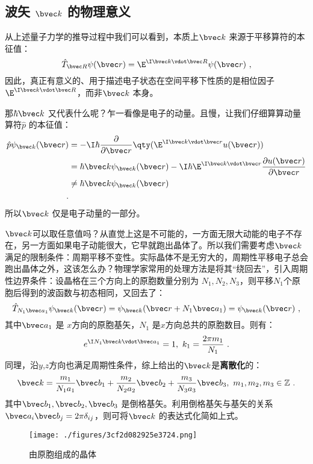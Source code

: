 \subsection{波矢 $\bvec k$ 的物理意义}
从上述量子力学的推导过程中我们可以看到，本质上$\bvec k$ 来源于平移算符的本征值：
\begin{equation}
\hat{T}_{\bvec R} \psi (\bvec r) = \E^{\I \bvec k \vdot  \bvec R}\psi (\bvec r)~,
\end{equation}
因此，真正有意义的、用于描述电子状态在空间平移下性质的是相位因子$\E^{\I \bvec k \vdot  \bvec R}$，而非$\bvec k$ 本身。

那$\hbar \bvec k$ 又代表什么呢？乍一看像是电子的动量。且慢，让我们仔细算算动量算符$\hat{p}$ 的本征值：
\begin{equation}
\begin{aligned}
\hat{p} \psi_{\bvec k} (\bvec r) &= -\I \hbar \dfrac{\partial}{\partial \bvec r} \qty(\E^{\I \bvec k \vdot \bvec r} u(\bvec r))\\
& = \hbar \bvec k \psi_{\bvec k} (\bvec r) -\I \hbar \E^{\I \bvec k \vdot \bvec r} \dfrac{\partial  u(\bvec r)}{\partial \bvec r}\\
 &\neq \hbar \bvec k \psi_{\bvec k} (\bvec r)\\~.
\end{aligned}
\end{equation}
所以$\bvec k$ 仅是电子动量的一部分。

$\bvec k$可以取任意值吗？从直觉上这是不可能的，一方面无限大动能的电子不存在，另一方面如果电子动能很大，它早就跑出晶体了。所以我们需要考虑$\bvec k$ 满足的限制条件：周期平移不变性。实际晶体不是无穷大的，周期性平移电子总会跑出晶体之外，这该怎么办？物理学家常用的处理方法是将其“绕回去”，引入周期性边界条件：设晶格在三个方向上的原胞数量分别为 $N_1,N_2,N_3$，则平移$N_1$个原胞后得到的波函数与初态相同，又回去了：
\begin{equation}
\hat T _{N_1 \bvec a_1}\psi_{\bvec k}(\bvec r)=\psi_{\bvec k}(\bvec r+N_1 \bvec a_1) = \psi_{\bvec k}(\bvec r)~,
\end{equation}
其中$\bvec a_1$ 是 $x$方向的原胞基矢，$N_1$ 是$x$方向总共的原胞数目。则有：
\begin{equation}
e^{\I N_1 \bvec k \vdot  \bvec a_1} = 1,~ k_1 =\frac{2\pi m_1}{N_1}~.
\end{equation}
同理，沿$y$,$z$方向也满足周期性条件，综上给出的$\bvec k$是\textbf{离散化}的：
\begin{equation}
\bvec k = \dfrac{m_1}{N_1 a_1} \bvec b_1 + \dfrac{m_2}{N_2 a_2} \bvec b_2 + \dfrac{m_3}{N_3 a_3} \bvec b_3,~ m_1,m_2,m_3 \in \mathbb{Z}~.
\end{equation}
其中$\bvec b_1, \bvec b_2,\bvec b_3$ 是倒格基矢。利用倒格基矢与基矢的关系$\bvec a_i \bvec b_j = 2\pi \delta_{ij}$，则可将$\bvec k$ 的表达式化简如上式。
\begin{figure}[ht]
\centering
\texttt{[image: ./figures/3cf2d082925e3724.png]}
\caption{由原胞组成的晶体} \label{fig_Bloch_6}
\end{figure}

